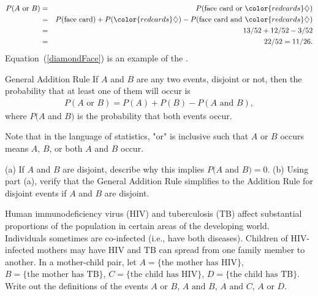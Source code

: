 \begin{eqnarray}
P(A\text{ or } B) &=&P(\text{face card or }{\color{redcards}\diamondsuit})  \notag \\
 &=& P(\text{face card}) + P({\color{redcards}\diamondsuit}) - P(\text{face card and }{\color{redcards}\diamondsuit}) \label{diamondFace} \\
 &=& 13/52 + 12/52 - 3/52 \notag \\
 &=& 22/52 = 11/26. \notag
\end{eqnarray}
Equation~(\ref{diamondFace}) is an example of the . 

\begin{onebox}{General Addition Rule}
If $A$ and $B$ are any two events, disjoint or not, then the probability that at least one of them will occur is
\begin{eqnarray}
P(A\text{ or }B) = P(A) + P(B) - P(A\text{ and }B),
\label{generalAdditionRule}
\end{eqnarray}
where $P(A$ and $B)$ is the probability that both events occur.
\end{onebox}

Note that in the language of statistics, "or" is inclusive such that $A$ or $B$ occurs means $A$, $B$, or both $A$ and $B$ occur.

\begin{exercisewrap}
\begin{nexercise}
(a) If $A$ and $B$ are disjoint, describe why this implies $P(A$ and $B) = 0$. (b) Using part (a), verify that the General Addition Rule simplifies to the Addition Rule for disjoint events if $A$ and $B$ are disjoint.\footnotemark{}
\end{nexercise}
\end{exercisewrap}

\begin{exercisewrap}
\begin{nexercise}
Human immunodeficiency virus (HIV) and tuberculosis (TB) affect substantial proportions of the population in certain areas of the developing world. Individuals sometimes are co-infected (i.e., have both diseases). Children of HIV-infected mothers may have HIV and TB can spread from one family member to another.  In a mother-child pair, let $A = \{\text{the mother has HIV} \}$,  $B = \{\textrm{the mother has TB} \}$, $C = \{\text{the child has HIV} \}$,  $D = \{\text{the child has TB} \}$.  Write out the definitions of the events $A \text{ or } B$, $A \text{ and } B$, $A \text{ and } C$, $A \text{ or } D$.\footnotemark{}
\end{nexercise}
\end{exercisewrap}


